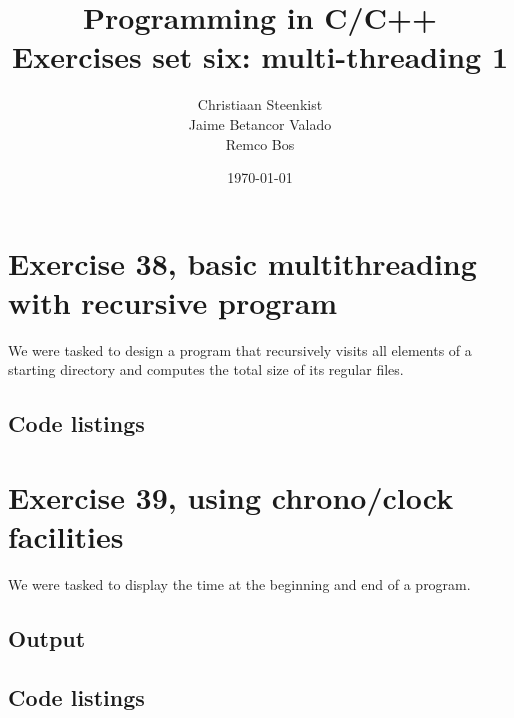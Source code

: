 \documentclass[11pt]{article}
\begin{document}
\title{Programming in C/C++ \\
       Exercises set six: multi-threading 1
}
\date{\today}
\author{Christiaan Steenkist \\
Jaime Betancor Valado \\
Remco Bos \\
}

\maketitle
\section*{Exercise 38, basic multithreading with recursive program}
We were tasked to design a program that recursively visits all elements of a starting directory and computes the total size of its regular files.

\subsection*{Code listings}





\section*{Exercise 39, using chrono/clock facilities }
We were tasked to display the time at the beginning and end of a program.

\subsection*{Output}


\subsection*{Code listings}







\end{document}
